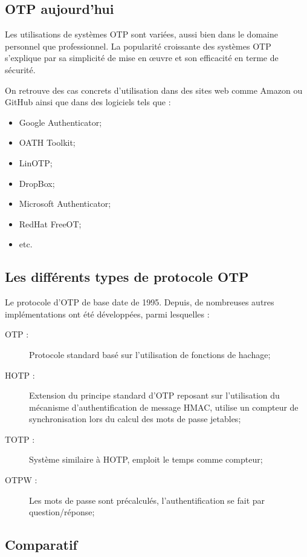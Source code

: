 \subsection{OTP aujourd'hui}

	Les utilisations de systèmes OTP sont variées, aussi bien dans le domaine
	personnel que professionnel. La popularité croissante des systèmes OTP
	s'explique par sa simplicité de mise en œuvre et son efficacité en terme
	de sécurité.

	On retrouve des cas concrets d'utilisation dans des sites web comme Amazon
	ou GitHub ainsi que dans des logiciels tels que :

	\begin{itemize}
		\item Google Authenticator;
		\item OATH Toolkit;
		\item LinOTP;
		\item DropBox;
		\item Microsoft	Authenticator;
		\item RedHat FreeOT;
		\item etc.
	\end{itemize}

\subsection{Les différents types de protocole OTP}

	Le protocole d'OTP de base date de 1995. Depuis, de nombreuses autres
	implémentations ont été développées, parmi lesquelles :

	\begin{description}
		\item[OTP :] Protocole standard basé sur l'utilisation de fonctions de
		hachage;
		\item[HOTP :] Extension du principe standard d'OTP reposant sur
		l'utilisation du mécanisme d'authentification de message HMAC, utilise
		un compteur de synchronisation lors du calcul des mots de passe
		jetables;
		\item[TOTP :] Système similaire à HOTP, emploit le temps comme
		compteur;
		\item[OTPW :] Les mots de passe sont précalculés, l'authentification
		se fait par question/réponse;
	\end{description}

\subsection{Comparatif}
